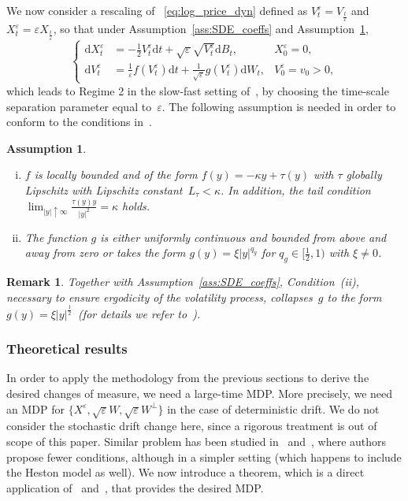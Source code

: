 \documentclass{amsart}[11pt]
\numberwithin{equation}{section}
\numberwithin{theorem}{subsection}
\numberwithin{proposition}{subsection}
\numberwithin{definition}{subsection}
\numberwithin{lemma}{subsection}
\newtheorem*{remark}{Remark}
\newtheorem{assumption}{Assumption}
\numberwithin{assumption}{subsection}
\newcommand{\ct}{\circ_{t}}
\newcommand{\Wp}{W^{\perp}}
\newcommand{\D}{\mathrm{d}}
\newcommand{\eps}{\varepsilon}
\begin{document}
We now consider a rescaling of ~\eqref{eq:log_price_dyn}
defined as $V_t^\eps = V_{\frac{t}{\eps}}$ and $X_t^\eps = \eps X_{\frac{t}{\eps}}$, so that under Assumption~\ref{ass:SDE_coeffs} and Assumption~\ref{ass:SDE_largetime_MDP},
\begin{equation}\label{eq:large_time_MD_dynamics}
\left\{
\begin{array}{rll}
\D X^\eps_t &= \displaystyle -\frac{1}{2}V_t^\eps \D t + \sqrt{\eps}\sqrt{V_t^\eps}\D B_t, 
& X_0^\eps = 0,\\
\D V_t^\eps &= \displaystyle \frac{1}{\eps}f(V_t^\eps)\D t + \frac{1}{\sqrt{\eps}}g(V_t^\eps)\D W_t, 
& V_0^\eps = v_0>0,
\end{array}
\right.\end{equation}
which leads to Regime 2 in the slow-fast setting of~\cite[Theorem 2.1]{Morse2017}, 
by choosing the time-scale separation parameter equal to~$\eps$. The following assumption is needed in order to conform to the conditions in~\cite{Morse2017}.
\begin{assumption}\label{ass:SDE_largetime_MDP}\
\begin{enumerate}[(i)]
    \item $f$ is locally bounded and of the form $f(y) = -\kappa y +\tau(y)$ with $\tau$ globally Lipschitz with Lipschitz constant~$L_{\tau}<\kappa$. In addition, the tail condition $\lim_{|y| \uparrow\infty}\frac{\tau(y)y}{|y|^2} = \kappa$ holds.
    \item The function $g$ is either uniformly continuous and bounded from above and away from zero or takes the form $g(y) = \xi |y|^{q_g}$ for $q_g \in [\frac{1}{2},1)$ with $\xi\ne 0$.
\end{enumerate}
\end{assumption}
\begin{remark}
Together with Assumption~\ref{ass:SDE_coeffs}, 
Condition~(ii), necessary to ensure ergodicity of the volatility process, collapses~$g$ to the form $g(y)=\xi |y|^\frac{1}{2}\,$ (for details we refer to~\cite{Jacquier2019,Morse2017}).
\end{remark}

\subsubsection{Theoretical results}
In order to apply the methodology from the previous sections to derive the desired changes of measure, we need a large-time MDP. More precisely, we need an MDP for $\{X^{\eps},\sqrt{\eps}W,\sqrt{\eps}\Wp\}$ in the case of deterministic drift. We do not consider the stochastic drift change here, since a rigorous treatment is out of scope of this paper.
Similar problem has been studied in~\cite[Theorem 2.1]{Morse2017} and~\cite[Theorem 3.3]{Jacquier2019}, where authors propose fewer conditions, although in a simpler setting (which happens to include the Heston model as well). %
We now introduce a theorem, which is a direct application of~\cite[Theorem~3.3]{Jacquier2019} and~\cite[Theorem~2.1]{Morse2017}, that provides the desired MDP.
\end{document}
